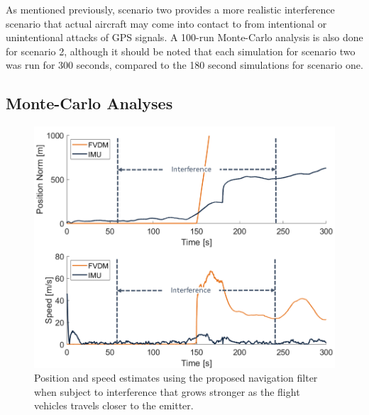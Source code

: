 As mentioned previously, scenario two provides a more realistic interference scenario that actual aircraft may come into contact to from intentional or unintentional attacks of GPS signals. A 100-run Monte-Carlo analysis is also done for scenario 2, although it should be noted that each simulation for scenario two was run for 300 seconds, compared to the 180 second simulations for scenario one.

\subsection{\textbf{Monte-Carlo Analyses}}

\begin{figure}[!ht]
    \centering
    \includegraphics[width=0.75\linewidth]{Figures/Results/trajectoryfigure/Slide19.PNG}
    \caption{Position and speed estimates using the proposed navigation filter when subject to interference that grows stronger as the flight vehicles travels closer to the emitter.}\label{fig:PosVelScene2}
\end{figure}


